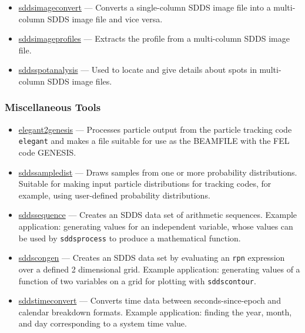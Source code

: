 \documentclass[11pt]{article}
\newcommand{\progref}[1]{\hyperref{#1}{{\tt #1} (}{)}{#1}}
\begin{document}
\begin{itemize}

\item \progref{sddsimageconvert} --- Converts a single-column SDDS image file into a multi-column SDDS image file and vice versa.

\item \progref{sddsimageprofiles} --- Extracts the profile from a multi-column SDDS image file.

\item \progref{sddsspotanalysis} --- Used to locate and give details about spots in multi-column SDDS image files.

\end{itemize}

\subsubsection{Miscellaneous Tools}

\begin{itemize}

\item \progref{elegant2genesis} --- Processes particle output from the particle tracking code
        \verb|elegant|\cite{elegant}
        and makes a file suitable for use as the BEAMFILE with the FEL code GENESIS\cite{GENESIS}.

\item \progref{sddssampledist} --- Draws samples from one or more probability distributions.
        Suitable for making input particle distributions for tracking codes, for example, 
        using user-defined probability distributions.

\item \progref{sddssequence} --- Creates an SDDS data set of arithmetic sequences. 
Example application: generating values for an independent variable, whose values can be used by
{\tt sddsprocess} to produce a mathematical function.

\item \progref{sddscongen} --- Creates an SDDS data set by evaluating an \verb|rpn| expression over a defined 2
dimensional grid.  Example application: generating values of a function of two variables on a grid for plotting
with {\tt sddscontour}.

\item \progref{sddstimeconvert} --- Converts time data between seconds-since-epoch and calendar breakdown formats.
Example application: finding the year, month, and day corresponding to a system time value.

\end{itemize}
\end{document}
